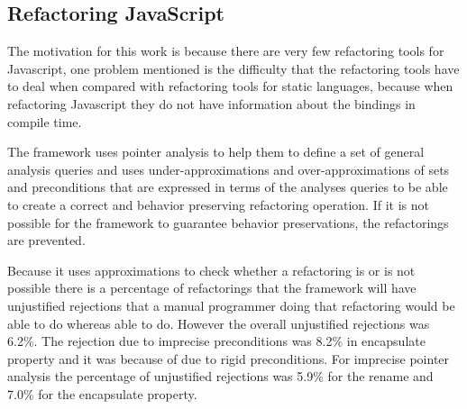 \subsection{Refactoring JavaScript}

The motivation for this work \cite{feldthaus2011tool} is because there are very few refactoring tools for Javascript, one problem mentioned is the difficulty that the refactoring tools have to deal when compared with refactoring tools for static languages, because when refactoring Javascript they do not have information about the bindings in compile time.


The framework uses pointer analysis to help them to define a set of general analysis queries and uses under-approximations and over-approximations of sets and preconditions that are expressed in terms of the analyses queries to be able to create a correct and behavior preserving refactoring operation. If it is not possible for the framework to guarantee behavior preservations, the refactorings are prevented.


Because it uses approximations to check whether a refactoring is or is not possible there is a percentage of refactorings that the framework will have unjustified rejections that a manual programmer doing that refactoring would be able to do whereas able to do. However the overall unjustified rejections was 6.2\%. The rejection due to imprecise preconditions was 8.2\% in encapsulate property and it was because of due to rigid preconditions. For imprecise pointer analysis the percentage of unjustified rejections was 5.9\% for the rename and 7.0\% for the encapsulate property.
